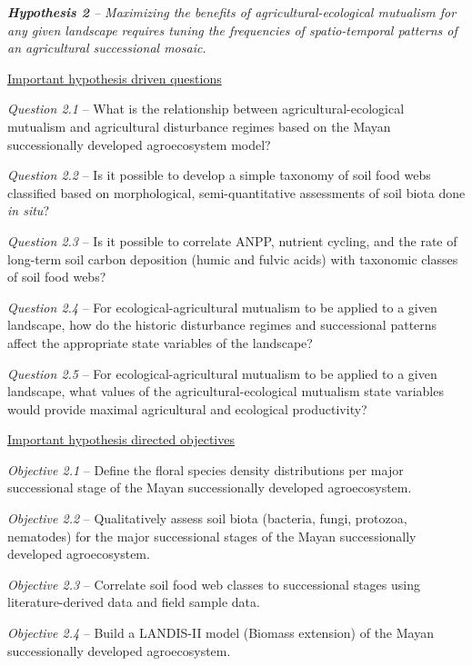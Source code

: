 \begin{description}
	
	\item{\textit{\textbf{Hypothesis 2} -- Maximizing the benefits of agricultural-ecological mutualism for any given landscape requires tuning the frequencies of spatio-temporal patterns of an agricultural successional mosaic.}}
	
	\underline{Important hypothesis driven questions}
	\begin{description}
		\item{\textit{Question 2.1} -- What is the relationship between agricultural-ecological mutualism and agricultural disturbance regimes based on the Mayan successionally developed agroecosystem model?}		
		\item{\textit{Question 2.2} -- Is it possible to develop a simple taxonomy of soil food webs classified based on morphological, semi-quantitative assessments of soil biota done \textit{in situ}?}
		\item{\textit{Question 2.3} -- Is it possible to correlate ANPP, nutrient cycling, and the rate of long-term soil carbon deposition (humic and fulvic acids) with taxonomic classes of soil food webs?}
		\item{\textit{Question 2.4} -- For ecological-agricultural mutualism to be applied to a given landscape, how do the historic disturbance regimes and successional patterns affect the appropriate state variables of the landscape?}
		\item{\textit{Question 2.5} -- For ecological-agricultural mutualism to be applied to a given landscape, what values of the agricultural-ecological mutualism state variables would provide maximal agricultural and ecological productivity?}
	\end{description}
	
	\underline{Important hypothesis directed objectives}
	\begin{description}
	\item{\textit{Objective 2.1} -- Define the floral species density distributions per major successional stage of the Mayan successionally developed agroecosystem.}
	\item{\textit{Objective 2.2} -- Qualitatively assess soil biota (bacteria, fungi, protozoa, nematodes) for the major successional stages of the Mayan successionally developed agroecosystem.}
	\item{\textit{Objective 2.3} -- Correlate soil food web classes to successional stages using literature-derived data and field sample data.}
	\item{\textit{Objective 2.4} -- Build a LANDIS-II model (Biomass extension) of the Mayan successionally developed agroecosystem.}
	\end{description}
	

\end{description}
